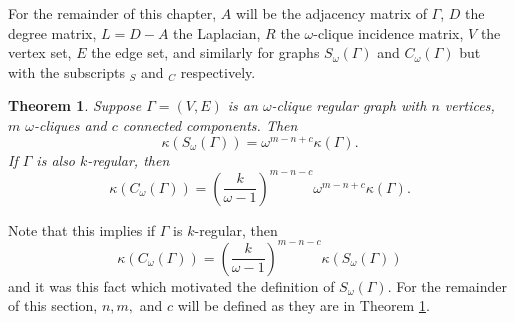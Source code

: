 \documentclass[12pt]{report}
\newtheorem{thm}{Theorem}[chapter]
\theoremstyle{definition}
\begin{document}
For the remainder of this chapter, $A$ will be the adjacency matrix of $\Gamma$, $D$ the degree matrix, $L=D-A$ the Laplacian, $R$ the $\omega$-clique incidence matrix, $V$ the vertex set, $E$ the edge set, and similarly for graphs $S_\omega(\Gamma)$ and $C_\omega(\Gamma)$ but with the subscripts $_S$ and $_C$ respectively.
\begin{thm}\label{thm:order}
    Suppose $\Gamma=(V,E)$ is an $\omega$-clique regular graph with $n$ vertices, $m$ $\omega$-cliques and $c$ connected components. Then 
    \begin{equation}\kappa(S_\omega(\Gamma))=\omega^{m-n+c}\kappa(\Gamma). \label{eq:spantree1}\end{equation}
    If $\Gamma$ is also $k$-regular, then
    \begin{equation}\kappa(C_\omega(\Gamma))=\left(\frac{k}{\omega-1}\right)^{m-n-c}\omega^{m-n+c}\kappa(\Gamma). \label{eq:spantree2}\end{equation}
\end{thm}
Note that this implies if $\Gamma$ is $k$-regular, then \[\kappa(C_\omega(\Gamma))=\left(\frac{k}{\omega-1}\right)^{m-n-c}\kappa(S_\omega(\Gamma))\] and it was this fact which motivated the definition of $S_\omega(\Gamma)$. For the remainder of this section, $n,m,$ and $c$ will be defined as they are in Theorem \ref{thm:order}.
\end{document}
